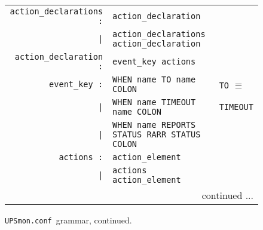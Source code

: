 \documentclass[12pt]{article}
\newcommand{\UPSmonconf}{\textcolor{UPSMONCOLOUR}{\texttt{UPSmon.conf}}}
\begin{document}
\begin{figure}[ht]
\begin{center}
\begin{tabular}{|rp{0.65\LinePrinterwidth}|p{0.15\LinePrinterwidth}|}
\texttt{action\_declarations :}        & \texttt{action\_declaration} & \\
                     \texttt{|}        & \texttt{action\_declarations action\_declaration} & \\ \hline
\texttt{action\_declaration :}         & \texttt{event\_key actions} & \\ \hline
\texttt{event\_key :}      & \texttt{WHEN name TO      name COLON} & \texttt{TO} $\equiv$ \\
           \texttt{|}      & \texttt{WHEN name TIMEOUT name COLON} & \texttt{TIMEOUT} \\
           \texttt{|}      & \texttt{WHEN name REPORTS STATUS RARR STATUS COLON} & \\
\texttt{actions :}         & \texttt{action\_element} & \\
         \texttt{|}        & \texttt{actions action\_element} & \\ \hline\hline
\multicolumn{3}{|r|}{\small continued ...} \\ \hline
\end{tabular}
\caption{\UPSmonconf\ grammar, continued.\label{fig:yacc:c}}
\end{center}
\end{figure}
\end{document}
